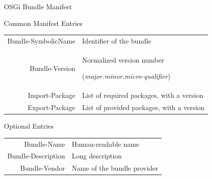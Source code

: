 \begin{frame}{OSGi Bundle Manifest}
\begin{block}{Common Manifest Entries}
\begin{center}
\begin{tabular}{rp{}}
Bundle-SymbolicName & Identifier of the bundle\\
Bundle-Version & Normalized version number \par (\textit{major.minor.micro-qualifier})\\
Import-Package & List of required packages, with a version\\
Export-Package & List of provided packages, with a version\\
\end{tabular}
\end{center}
\end{block}

\begin{block}{Optional Entries}
\begin{center}
\begin{tabular}{rp{}}
Bundle-Name & Human-readable name\\
Bundle-Description & Long description\\
Bundle-Vendor & Name of the bundle provider\\
\end{tabular}
\end{center}
\end{block}
\end{frame}

